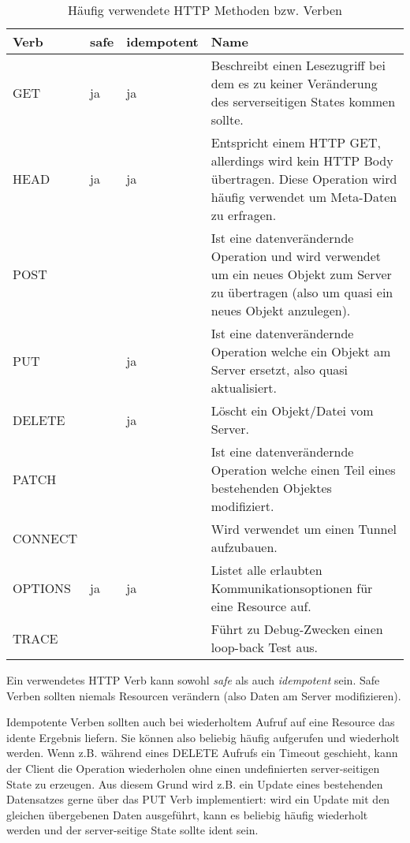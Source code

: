 \begin{table}
	\begin{center}
\begin{tabular}{lllp{6cm}}
	\toprule
	Verb & safe & idempotent & Name\\
	\midrule
	GET  & ja & ja & Beschreibt einen Lesezugriff bei dem es zu keiner Veränderung des serverseitigen States kommen sollte. \\
	HEAD & ja & ja &  Entspricht einem HTTP GET, allerdings wird kein HTTP Body übertragen. Diese Operation wird häufig verwendet um Meta-Daten zu erfragen.\\
	POST &    &    & Ist eine datenverändernde Operation und wird verwendet um ein neues Objekt zum Server zu übertragen (also um quasi ein neues Objekt anzulegen).\\
	PUT  &    & ja & Ist eine datenverändernde Operation welche ein Objekt am Server ersetzt, also quasi aktualisiert. \\
	DELETE &  & ja & Löscht ein Objekt/Datei vom Server. \\
	PATCH &   &    & Ist eine datenverändernde Operation welche einen Teil eines bestehenden Objektes modifiziert. \\
	CONNECT & &    & Wird verwendet um einen Tunnel aufzubauen. \\
	OPTIONS & ja & ja & Listet alle erlaubten Kommunikationsoptionen für eine Resource auf. \\
	TRACE &   &    & Führt zu Debug-Zwecken einen loop-back Test aus. \\
	\bottomrule
\end{tabular}
	\caption{Häufig verwendete HTTP Methoden bzw. Verben}
	\label{tbl:http_verbs}
\end{center}
\end{table}

Ein verwendetes HTTP Verb kann sowohl \textit{safe} als auch \textit{idempotent} sein. Safe Verben sollten niemals Resourcen verändern (also Daten am Server modifizieren).

Idempotente Verben sollten auch bei wiederholtem Aufruf auf eine Resource das idente Ergebnis liefern. Sie können also beliebig häufig aufgerufen und wiederholt werden. Wenn z.B. während eines DELETE Aufrufs ein Timeout geschieht, kann der Client die Operation wiederholen ohne einen undefinierten server-seitigen State zu erzeugen. Aus diesem Grund wird z.B. ein Update eines bestehenden Datensatzes gerne über das PUT Verb implementiert: wird ein Update mit den gleichen übergebenen Daten ausgeführt, kann es beliebig häufig wiederholt werden und der server-seitige State sollte ident sein.

